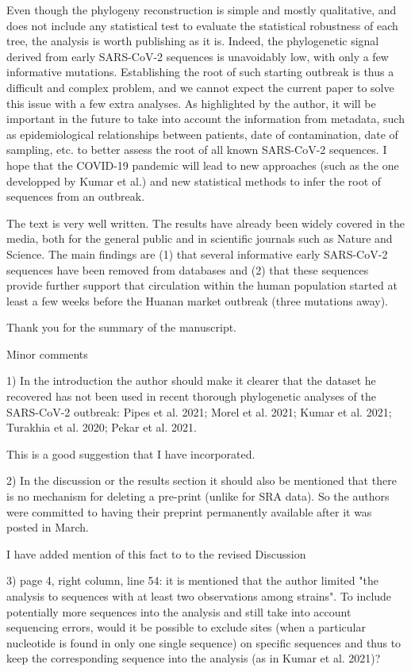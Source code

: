 \documentclass[11pt, oneside]{article}   	%
\newcommand{\response}[1]{{\color{black}#1}}
\begin{document}
Even though the phylogeny reconstruction is simple and mostly qualitative, and does not include any statistical test to evaluate the statistical robustness of each tree, the analysis is worth publishing as it is. Indeed, the phylogenetic signal derived from early SARS-CoV-2 sequences is unavoidably low, with only a few informative mutations. Establishing the root of such starting outbreak is thus a difficult and complex problem, and we cannot expect the current paper to solve this issue with a few extra analyses. As highlighted by the author, it will be important in the future to take into account the information from metadata, such as epidemiological relationships between patients, date of contamination, date of sampling, etc. to better assess the root of all known SARS-CoV-2 sequences. I hope that the COVID-19 pandemic will lead to new approaches (such as the one developped by Kumar et al.) and new statistical methods to infer the root of sequences from an outbreak.

The text is very well written. The results have already been widely covered in the media, both for the general public and in scientific journals such as Nature and Science. The main findings are (1) that several informative early SARS-CoV-2 sequences have been removed from databases and (2) that these sequences provide further support that circulation within the human population started at least a few weeks before the Huanan market outbreak (three mutations away).

\response{Thank you for the summary of the manuscript.}

Minor comments

1) In the introduction the author should make it clearer that the dataset he recovered has not been used in recent thorough phylogenetic analyses of the SARS-CoV-2 outbreak: Pipes et al. 2021; Morel et al. 2021; Kumar et al. 2021; Turakhia et al. 2020; Pekar et al. 2021.

\response{This is a good suggestion that I have incorporated.}

2) In the discussion or the results section it should also be mentioned that there is no mechanism for deleting a pre-print (unlike for SRA data). So the authors were committed to having their preprint permanently available after it was posted in March.

\response{I have added mention of this fact to to the revised Discussion}

3) page 4, right column, line 54: it is mentioned that the author limited "the analysis to sequences with at least two observations among strains". To include potentially more sequences into the analysis and still take into account sequencing errors, would it be possible to exclude sites (when a particular nucleotide is found in only one single sequence) on specific sequences and thus to keep the corresponding sequence into the analysis (as in Kumar et al. 2021)? 
\end{document}
